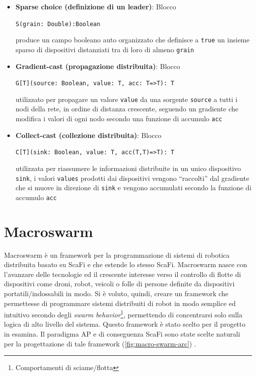 \documentclass[12pt,a4paper,openright,twoside]{book}
\begin{document}
\begin{itemize}
    \item \textbf{Sparse choice (definizione di un leader)}: Blocco 
    \begin{center}
        \verb|S(grain: Double):Boolean|
    \end{center}
    produce un campo booleano auto organizzato che definisce a \verb|true| un insieme sparso di dispositivi distanziati tra di loro di almeno \verb|grain|
    \item \textbf{Gradient-cast (propagazione distribuita)}: Blocco 
    \begin{center}
        \verb|G[T](source: Boolean, value: T, acc: T=>T): T|
    \end{center}
    utilizzato per propagare un valore \verb|value| da una sorgente \verb|source| a tutti i nodi della rete, in ordine di distanza crescente, seguendo un gradiente che modifica i valori di ogni nodo secondo una funzione di accumulo \verb|acc|
    \item \textbf{Collect-cast (collezione distribuita)}: Blocco 
    \begin{center}
        \verb|C[T](sink: Boolean, value: T, acc(T,T)=>T): T| 
    \end{center}
    utilizzata per riassumere le informazioni distribuite in un unico dispositivo \verb|sink|, i valori \verb|values| prodotti dai dispositivi vengono ``raccolti'' dal gradiente che si muove in direzione di \verb|sink| e vengono accumulati secondo la funzione di accumulo \verb|acc|
\end{itemize}

\section{Macroswarm}

Macroswarm è un framework per la programmazione di sistemi di robotica distribuita basato su ScaFi e che estende lo stesso ScaFi. Macroswarm nasce con l'avanzare delle tecnologie ed il crescente interesse verso il controllo di flotte di dispositivi come droni, robot, veicoli o folle di persone definite da dispositivi portatili/indossabili in modo.
Si è voluto, quindi, creare un framework che permettesse di programmare sistemi distribuiti di robot in modo semplice ed intuitivo secondo degli \textit{swarm behavior}\footnote{Comportamenti di sciame/flotta}, permettendo di concentrarsi solo sulla logica di alto livello del sistema. Questo framework è stato scelto per il progetto in esamina.
Il paradigma \ac{AP} e di conseguenza ScaFi sono state scelte naturali per la progettazione di tale framework (\cref{fig:macro-swarm-arc}) \cite{Macroswarm}.
\end{document}
